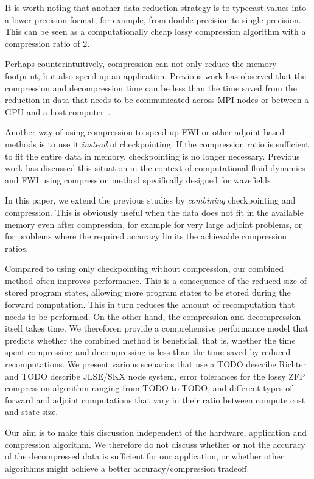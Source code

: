 \documentclass[conference]{IEEEtran}
\begin{document}
It is worth noting that another data reduction strategy is to typecast values
into a lower precision format, for example, from double precision to single
precision. This can be seen as a computationally cheap lossy compression
algorithm with a compression ratio of $2$.

Perhaps counterintuitively, compression can not only reduce the memory
footprint, but also speed up an application. Previous work has observed that the
compression and decompression time can be less than the time saved from the
reduction in data that needs to be communicated across MPI nodes or between a
GPU and a host computer~\cite{gpu-compression}.

Another way of using compression to speed up FWI or other adjoint-based methods
is to use it \emph{instead} of checkpointing. If the compression ratio is
sufficient to fit the entire data in memory, checkpointing is no longer
necessary. Previous work has discussed this situation in the context of
computational fluid dynamics~\cite{cyr2015towards} and FWI using compression
method specifically designed for
wavefields~\cite{dalmau2014lossy,boehm2016wavefield}.

In this paper, we extend the previous studies by \emph{combining} checkpointing
and compression. This is obviously useful when the data does not fit in the
available memory even after compression, for example for very large adjoint
problems, or for problems where the required accuracy limits the achievable
compression ratios.

Compared to using only checkpointing without compression, our combined method
often improves performance. This is a consequence of the reduced size of stored
program states, allowing more program states to be stored during the forward
computation. This in turn reduces the amount of recomputation that needs to be
performed. On the other hand, the compression and decompression itself takes
time. We thereforen provide a comprehensive performance model that predicts
whether the combined method is beneficial, that is, whether the time spent
compressing and decompressing is less than the time saved by reduced
recomputations. We present various scenarios that use a TODO describe Richter
and TODO describe JLSE/SKX node system, error tolerances for the lossy ZFP
compression algorithm ranging from TODO to TODO, and different types of forward
and adjoint computations that vary in their ratio between compute cost and state
size. 

Our aim is to make this discussion independent of the hardware, application and
compression algorithm. We therefore do not discuss whether or not the accuracy
of the decompressed data is sufficient for our application, or whether
other algorithms might achieve a better accuracy/compression tradeoff.
\end{document}
